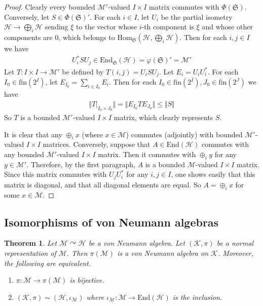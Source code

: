 \documentclass[12pt,b5paper,notitlepage]{article}
\theoremstyle{definition}
\theoremstyle{plain}
\newtheorem{thm}[df]{Theorem}
\newcommand{\fk}{\mathfrak}
\newcommand{\mc}{\mathcal}
\newcommand{\End}{\mathrm{End}} %
\newcommand{\Hom}{\mathrm{Hom}}
\newcommand{\fin}{\mathrm{fin}}
\numberwithin{equation}{section}
\begin{document}
\begin{proof}
Clearly every bounded $\mc M'$-valued $I\times I$ matrix commutes with $\Phi(\fk S)$. Conversely, let $S\in\Phi(\fk S)'$. For each $i\in I$, let $U_i$ be the partial isometry $\mc H\rightarrow\bigoplus_i\mc H$ sending $\xi$ to the vector whose $i$-th component is $\xi$ and whose other components are $0$, which belongs to $\Hom_{\fk S}(\mc H,\bigoplus_i\mc H)$. Then for each $i,j\in I$ we have
\begin{align*}
U_i^*SU_j\in\End_\fk S(\mc H)=\varphi(\fk S)'=\mc M'
\end{align*}
Let $T:I\times I\rightarrow\mc M'$ be defined by $T(i,j)=U_iSU_j$. Let $E_i=U_iU_i^*$. For each $I_0\in\fin(2^I)$, let $E_{I_0}=\sum_{i\in I_0}E_i$. Then for each $I_0\in\fin(2^I),J_0\in\fin(2^J)$ we have
\begin{align*}
\Vert T|_{I_0\times J_0}\Vert=\Vert E_{I_0}TE_{J_0}\Vert\leq\Vert S\Vert
\end{align*}
So $T$ is a bounded $\mc M'$-valued $I\times I$ matrix, which clearly represents $S$.

It is clear that any $\oplus_i x$ (where $x\in\mc M$) commutes (adjointly) with bounded $\mc M'$-valued $I\times I$ matrices. Conversely, suppose that $A\in\End(\mc H)$ commutes with any bounded $\mc M'$-valued $I\times I$ matrix. Then it commutes with $\oplus_i y$ for any $y\in\mc M'$. Therefore, by the first paragraph, $A$ is a bounded $\mc M$-valued $I\times I$ matrix. Since this matrix commutes with $U_jU_i^*$ for any $i,j\in I$, one shows easily that this matrix is diagonal, and that all diagonal elements are equal. So $A=\oplus_i x$ for some $x\in\mc M$. 
\end{proof}



\subsection*{Isomorphisms of von Neumann algebras}


\begin{thm}\label{lb85}
Let $\mc M\curvearrowright\mc H$ be a von Neumann algebra. Let $(\mc K,\pi)$ be a normal representation of $\mc M$. Then $\pi(\mc M)$ is a von Neumann algebra on $\mc K$. Moreover, the following are equivalent.
\begin{enumerate}
\item[(1)] $\pi:\mc M\rightarrow\pi(\mc M)$ is bijective.
\item[(2)] $(\mc K,\pi)\sim (\mc H,\iota_{\mc M})$ where $\iota_{\mc M}:\mc M\rightarrow\End(\mc H)$ is the inclusion.
\end{enumerate}
\end{thm}
\end{document}
